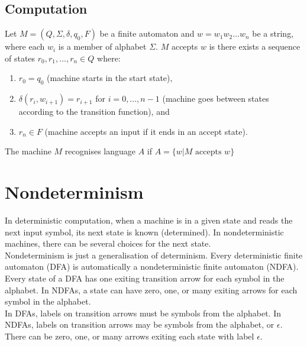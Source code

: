 \documentclass{article}
\begin{document}
\subsection{Computation}
Let $M = (Q, \Sigma, \delta, q_0, F)$ be a finite automaton and $w = w_1w_2...w_n$ be a string, where each $w_i$ is a member of alphabet $\Sigma$. $M$ accepts $w$ is there exists a sequence of states $r_0, r_1, ..., r_n \in Q$ where:
\begin{enumerate}
	\item $r_0 = q_0$ (machine starts in the start state),
	\item $\delta(r_i, w_{i+1}) = r_{i+1}$ for $i = 0, ..., n-1$ (machine goes between states according to the transition function), and
	\item $r_n \in F$ (machine accepts an input if it ends in an accept state).
\end{enumerate}
The machine $M$ recognises language $A$ if $A = \{w|M\text{ accepts } w\}$

\section{Nondeterminism}
In deterministic computation, when a machine is in a given state and reads the next input symbol, its next state is known (determined). In nondeterministic machines, there can be several choices for the next state.\medskip
\\ Nondeterminism is just a generalisation of determinism. Every deterministic finite automaton (DFA) is automatically a nondeterministic finite automaton (NDFA).\medskip
\\ Every state of a DFA has one exiting transition arrow for each symbol in the alphabet. In NDFAs, a state can have zero, one, or many exiting arrows for each symbol in the alphabet.\medskip
\\ In DFAs, labels on transition arrows must be symbols from the alphabet. In NDFAs, labels on transition arrows may be symbols from the alphabet, or $\epsilon$. There can be zero, one, or many arrows exiting each state with label $\epsilon$.
\end{document}
